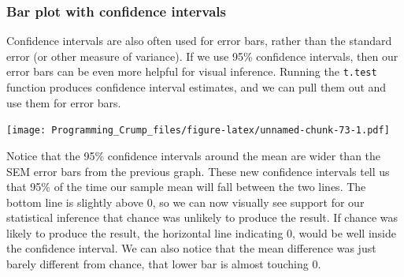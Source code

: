\documentclass[]{book}
\newenvironment{Shaded}{\begin{snugshade}}{\end{snugshade}}
\newcommand{\KeywordTok}[1]{\textcolor[rgb]{0.13,0.29,0.53}{\textbf{{#1}}}}
\newcommand{\DataTypeTok}[1]{\textcolor[rgb]{0.13,0.29,0.53}{{#1}}}
\newcommand{\DecValTok}[1]{\textcolor[rgb]{0.00,0.00,0.81}{{#1}}}
\newcommand{\StringTok}[1]{\textcolor[rgb]{0.31,0.60,0.02}{{#1}}}
\newcommand{\NormalTok}[1]{{#1}}
\theoremstyle{definition}
\theoremstyle{definition}
\theoremstyle{definition}
\theoremstyle{remark}
\begin{document}
\subsubsection{Bar plot with confidence
intervals}\label{bar-plot-with-confidence-intervals}

Confidence intervals are also often used for error bars, rather than the
standard error (or other measure of variance). If we use 95\% confidence
intervals, then our error bars can be even more helpful for visual
inference. Running the \texttt{t.test} function produces confidence
interval estimates, and we can pull them out and use them for error
bars.

\begin{Shaded}
\end{Shaded}

\texttt{[image: Programming\_Crump\_files/figure-latex/unnamed-chunk-73-1.pdf]}

Notice that the 95\% confidence intervals around the mean are wider than
the SEM error bars from the previous graph. These new confidence
intervals tell us that 95\% of the time our sample mean will fall
between the two lines. The bottom line is slightly above 0, so we can
now visually see support for our statistical inference that chance was
unlikely to produce the result. If chance was likely to produce the
result, the horizontal line indicating 0, would be well inside the
confidence interval. We can also notice that the mean difference was
just barely different from chance, that lower bar is almost touching 0.
\end{document}
